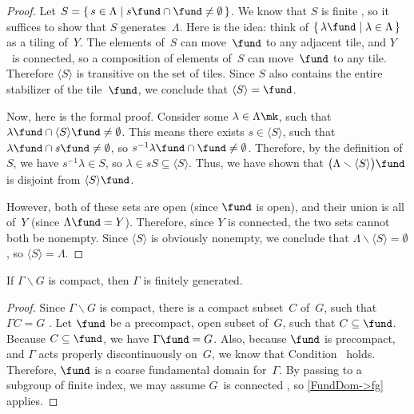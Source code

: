 \begin{proof}
 Let $S = \{\, s \in \Lambda \mid s \fund \cap
\fund \neq \emptyset \,\}$. We know that $S$ is finite
, so it suffices to show
that $S$ generates~$\Lambda$. Here is the idea: think of
$\{\, \lambda \fund \mid \lambda \in \Lambda \,\}$ as a
tiling of~$Y$. The elements of~$S$ can move~$\fund$ to any
adjacent tile, and $Y$~is connected, so a composition of
elements of~$S$ can move~$\fund$ to any tile. Therefore
$\langle S \rangle$ is transitive on the set of tiles.
Since $S$ also contains the entire stabilizer of the
tile~$\fund$, we conclude that $\langle S \rangle = \fund$.

Now, here is the formal proof. 
Consider some $\lambda \in \Lambda\mk$, such that $\lambda \fund \cap \langle S \rangle \fund \neq \emptyset$. This means there exists $s \in \langle S \rangle$, such that $\lambda \fund \cap s \fund \neq \emptyset$, so $s^{-1} \lambda \fund \cap \fund \neq \emptyset$. Therefore, by the definition of~$S$, we have $s^{-1} \lambda \in S$, so $\lambda \in s S \subseteq \langle S\rangle$. 
Thus, we have shown that $\bigl( \Lambda \smallsetminus \langle S \rangle \bigr) \fund$ is disjoint from $\langle S \rangle \fund$. 

However, both of these sets are open (since $\fund$ is open), and their union is all of~$Y$ (since $\Lambda \fund = Y$). Therefore, since $Y$ is connected, the two sets cannot both be nonempty. Since $\langle S \rangle$ is obviously nonempty, we conclude that $\Lambda \smallsetminus \langle S \rangle = \emptyset$, so $\langle S \rangle = \Lambda$.
 \end{proof}

\begin{cor} \label{cocpct->fg}
 If\/ $\Gamma \backslash G$ is compact, then\/ $\Gamma$ is
finitely generated.
 \end{cor}

\begin{proof}
 Since $\Gamma \backslash G$ is compact, there is a
compact subset~$C$ of~$G$, such that $\Gamma C = G$
. Let $\fund$ be a precompact, open
subset of~$G$, such that $C \subseteq \fund$. Because $C
\subseteq \fund$, we have $\Gamma \fund = G$. Also, because
$\fund$ is precompact, and $\Gamma$ acts properly
discontinuously on~$G$, we know that
Condition~ holds. Therefore, $\fund$ is
a coarse fundamental domain for~$\Gamma$.
By passing to a subgroup of finite index, we may assume $G$~is connected , so \cref{FundDom->fg} applies.
 \end{proof}

